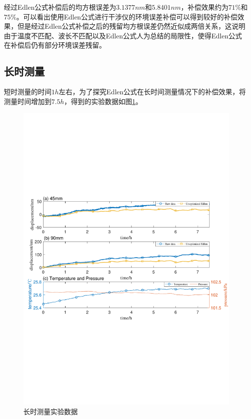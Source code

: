 经过Edlen公式补偿后的均方根误差为$3.1377nm$和$5.8401nm$，补偿效果约为$71\%$和$75\%$。可以看出使用Edlen公式进行干涉仪的环境误差补偿可以得到较好的补偿效果，但是经过Edlen公式补偿之后的残留均方根误差仍然近似成两倍关系，这说明由于温度不匹配、波长不匹配以及Edlen公式人为总结的局限性，使得Edlen公式在补偿后仍有部分环境误差残留。

\subsection{长时测量}
短时测量的时间$1h$左右，为了探究Edlen公式在长时间测量情况下的补偿效果，将测量时间增加到$7.5h$，得到的实验数据如图\ref{fig:长时测量实验数据}。
\begin{figure}[htb]
  \centering
  \includegraphics[width=14cm]{fig/3-fig/长时测量数据.pdf}
  \caption{长时测量实验数据}
  \label{fig:长时测量实验数据}
\end{figure}

